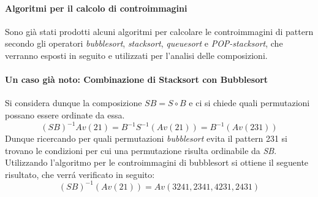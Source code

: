 \paragraph*{Algoritmi per il calcolo di controimmagini} Sono gi\`a stati prodotti alcuni algoritmi per calcolare le controimmagini di pattern secondo gli operatori \textit{bubblesort}\cite{albert2010inverse}, \textit{stacksort}\cite{claesson2012sorting}, \textit{queuesort}\cite{magnusson2013sorting} e \textit{POP-stacksort}\cite{magnusson2013sorting}, che verranno esposti in seguito e utilizzati per l'analisi delle composizioni.
\paragraph*{Un caso gi\`a noto: Combinazione di Stacksort con Bubblesort} Si considera dunque la composizione $SB = S\circ{B}$ e ci si chiede quali permutazioni possano essere ordinate da essa.$$(SB)^{-1}Av(21)=B^{-1}S^{-1}(Av(21))=B^{-1}(Av(231))$$
Dunque ricercando per quali permutazioni \textit{bubblesort} evita il pattern 231 si trovano le condizioni per cui una permutazione risulta ordinabile da \textit{SB}.\\
Utilizzando l'algoritmo per le controimmagini di bubblesort\cite{albert2010inverse} si ottiene il seguente risultato, che verr\'a verificato in seguito:
$$(SB)^{-1}(Av(21))=Av(3241, 2341, 4231, 2431)$$
